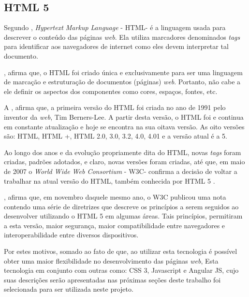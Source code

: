 \subsection{HTML 5}

Segundo , \textit{Hypertext Markup Language}  - HTML\footnotemark[23] - é a linguagem usada para descrever o conteúdo das páginas \textit{web}. Ela utiliza marcadores denominados \textit{tags} para identificar aos navegadores de internet como eles devem interpretar tal documento.

, afirma que, o HTML foi criado única e exclusivamente para ser uma linguagem de marcação e estruturação de documentos (páginas) \textit{web}. Portanto, não cabe a ele definir os aspectos dos componentes como cores, espaços, fontes, etc.


A , afirma que, a primeira versão do HTML foi criada no ano de 1991 pelo inventor da \textit{web}, Tim Berners-Lee. A partir desta versão, o HTML foi e continua em constante atualização e hoje se encontra na sua oitava versão. As oito versões são: HTML, HTML +, HTML 2.0, 3.0, 3.2, 4.0, 4.01 e a versão atual é a 5.

Ao longo dos anos e da evolução propriamente dita do HTML, novas \textit{tags} foram criadas, padrões adotados, e claro, novas versões foram criadas, até que, em maio de 2007  o \textit{World Wide Web Consortium} - W3C\footnotemark[24] - confirma a decisão de voltar a trabalhar na atual versão do HTML, também conhecida por HTML 5 \cite{w3c_html_fundamentals}.


, afirma que, em novembro daquele mesmo ano, o W3C publicou uma nota contendo uma série de diretrizes que descreve os princípios a serem seguidos ao desenvolver utilizando o HTML 5 em algumas áreas. Tais princípios, permitiram a esta versão, maior segurança, maior compatibilidade entre navegadores e interoperabilidade entre diversos dispositivos.

Por estes motivos, somado ao fato de que, ao utilizar esta tecnologia é possível obter uma maior flexibilidade no desenvolvimento das páginas \textit{web}, Esta tecnologia em conjunto com outras como: CSS 3, Javascript e Angular JS, cujo suas descrições serão apresentadas nas próximas seções deste trabalho foi selecionada para ser utilizada neste projeto.